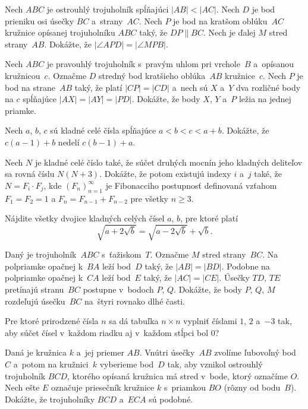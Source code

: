 {%
Nech $ABC$ je ostrouhlý trojuholník spĺňajúci $|AB|<|AC|$. Nech $D$ je bod prieniku osi úsečky $BC$ a~strany~$AC$.
Nech $P$ je bod na kratšom oblúku~$AC$ kružnice opísanej trojuholníku $ABC$ taký, že $DP\parallel BC$. Nech je ďalej $M$ stred strany~$AB$. Dokážte, že $|\angle APD|=|\angle MPB|$.}

{%
Nech $ABC$ je pravouhlý trojuholník s~pravým uhlom pri vrchole~$B$ a~opísanou kružnicou~$c$. Označme $D$ stredný bod kratšieho oblúka~$AB$ kružnice~$c$. Nech $P$ je bod na strane~$AB$ taký, že platí $|CP|=|CD|$ a~nech sú $X$ a~$Y$ dva rozličné body na $c$ spĺňajúce $|AX|=|AY|=|PD|$. Dokážte, že body $X$, $Y$ a~$P$ ležia na jednej priamke.}

{%
Nech $a$, $b$, $c$ sú kladné celé čísla spĺňajúce $a<b<c<a+b$. Dokážte, že
$c(a-1)+b$ nedelí $c(b-1)+a$.}

{%
Nech $N$ je kladné celé číslo také, že súčet druhých mocnín jeho kladných deliteľov sa rovná číslu $N(N+3)$.
Dokážte, že potom existujú indexy $i$ a~$j$ také, že
$N=F_i\cdot F_j$, kde $(F_n)_{n=1}^{\infty}$ je Fibonacciho postupnosť
definovaná vzťahom $F_1 = F_2 = 1$ a $F_n = F_{n-1} + F_{n-2}$ pre všetky
$n\ge3$.}

{%
Nájdite všetky dvojice kladných celých čísel $a$, $b$, pre ktoré platí $$\sqrt{a + 2\sqrt{b}} = \sqrt{a-2\sqrt{b}} + \sqrt{b}.$$}

{%
Daný je trojuholník~$ABC$ s~ťažiskom~$T$. Označme $M$ stred strany~$BC$. Na polpriamke opačnej k~$BA$ leží bod~$D$ taký, že $|AB|=|BD|$. Podobne na polpriamke opačnej k~$CA$ leží bod~$E$ taký, že $|AC|=|CE|$. Úsečky $TD$, $TE$ pretínajú stranu~$BC$ postupne v~bodoch $P$, $Q$. Dokážte, že body $P$, $Q$, $M$ rozdeľujú úsečku~$BC$ na~štyri rovnako dlhé časti.}

{%
Pre ktoré prirodzené čísla $n$ sa dá tabuľka $n\times n$ vyplniť číslami $1$, $2$ a~$-3$ tak, aby súčet čísel v~každom riadku aj v~každom stĺpci bol $0$?}

{%
Daná je kružnica $k$ a~jej priemer $AB$. Vnútri úsečky~$AB$
zvolíme ľubovoľný bod $C$ a~potom na kružnici~$k$ vyberieme bod~$D$
tak, aby vznikol ostrouhlý trojuholník $BCD$, ktorého opísaná kružnica má
stred v~bode, ktorý označíme $O$. Nech ešte $E$ označuje priesečník
kružnice $k$ s~priamkou $BO$ (rôzny od bodu~$B$).
Dokážte, že trojuholníky $BCD$ a~$ECA$ sú podobné.}

